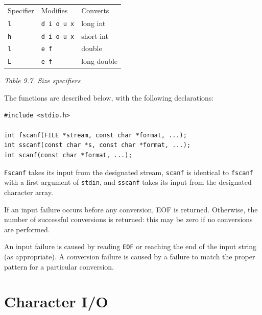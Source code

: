    \begin{tabular}{llp{\textwidth}}
     Specifier & Modifies & Converts
    \\

     \texttt{l} & \texttt{d i o u x} & long int
    \\

     \texttt{h} & \texttt{d i o u x} & short int
    \\

     \texttt{l} & \texttt{e f} & double
    \\

     \texttt{L} & \texttt{e f} & long double
    \\
\end{tabular}

\begin{center}\textit{Table 9.7. Size specifiers}\end{center}


   The functions are described below, with the following declarations:


   \begin{Verbatim}
#include <stdio.h>

int fscanf(FILE *stream, const char *format, ...);
int sscanf(const char *s, const char *format, ...);
int scanf(const char *format, ...);
\end{Verbatim}

   \texttt{Fscanf} takes its input from the designated stream,
    \texttt{scanf}  is identical  to  \texttt{fscanf}  with  a  first
    argument of \texttt{stdin}, and \texttt{sscanf} takes its input
    from the designated character array.


   If an input failure occurs before  any  conversion,  EOF  is returned.
    Otherwise,  the number of successful conversions is  returned:  this  may
    be  zero  if  no  conversions  are performed.


   An input failure is caused by reading \texttt{EOF}  or  reaching  the
    end  of  the  input  string  (as appropriate).  A conversion failure is
    caused by a failure to match the  proper  pattern for a particular
    conversion.


  

 
        \section{Character I/O}
        

